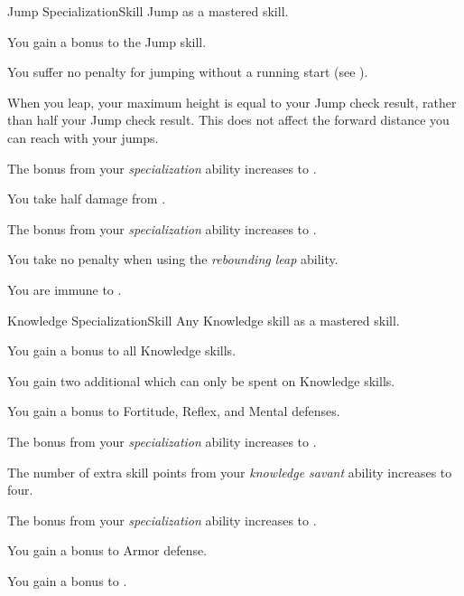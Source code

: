     \begin{feat}{Jump Specialization}{Skill}
        \featpre Jump as a mastered skill.

         You gain a  bonus to the Jump skill.

         You suffer no penalty for jumping without a running start (see ).

         When you leap, your maximum height is equal to your Jump check result, rather than half your Jump check result.
        This does not affect the forward distance you can reach with your jumps.

         The bonus from your \textit{specialization} ability increases to .

         You take half damage from .

         The bonus from your \textit{specialization} ability increases to .

         You take no penalty when using the \textit{rebounding leap} ability.

         You are immune to .
    \end{feat}

    \begin{feat}{Knowledge Specialization}{Skill}
        \featpre Any Knowledge skill as a mastered skill.

         You gain a  bonus to all Knowledge skills.

         You gain two additional  which can only be spent on Knowledge skills.

         You gain a  bonus to Fortitude, Reflex, and Mental defenses. 

         The bonus from your \textit{specialization} ability increases to .

         The number of extra skill points from your \textit{knowledge savant} ability increases to four.

         The bonus from your \textit{specialization} ability increases to .

         You gain a  bonus to Armor defense.

         You gain a  bonus to .
    \end{feat}

